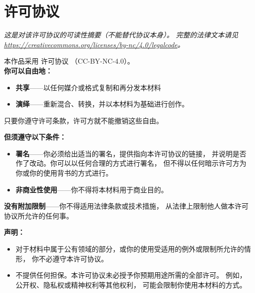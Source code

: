 \chapter{许可协议}\label{s:license}

{\setlength{\parindent}{0em}

\emph{
  这是对该许可协议的可读性摘要（不能替代协议本身）。
  完整的法律文本请见 \url{https://creativecommons.org/licenses/by-nc/4.0/legalcode}。
}

\vspace{\baselineskip}

\noindent
本作品采用
 许可协议
（CC-BY-NC-4.0）。\\

\noindent
\textbf{你可以自由地：}

\begin{itemize}
\item
  \textbf{共享}——以任何媒介或格式复制和再分发本材料
\item
  \textbf{演绎}——重新混合、转换，并以本材料为基础进行创作。
\end{itemize}

只要你遵守许可条款，许可方就不能撤销这些自由。

\vspace{\baselineskip}

\textbf{但须遵守以下条件：}

\begin{itemize}
\item
  \textbf{署名}——你必须给出适当的署名，提供指向本许可协议的链接，
  并说明是否作了改动。你可以以任何合理的方式进行署名，
  但不得以任何暗示许可方为你或你的使用背书的方式进行。 \\
\item
  \textbf{非商业性使用}——你不得将本材料用于商业目的。
\end{itemize}

\textbf{没有附加限制}——你不得适用法律条款或技术措施，
从法律上限制他人做本许可协议所允许的任何事。

\vspace{\baselineskip}

\textbf{声明：}

\begin{itemize}

\item
  对于材料中属于公有领域的部分，或你的使用受适用的例外或限制所允许的情形，
  你不必遵守本许可协议。

\item
  不提供任何担保。本许可协议未必授予你预期用途所需的全部许可。
  例如，公开权、隐私权或精神权利等其他权利，
  可能会限制你使用本材料的方式。

\end{itemize}
}
